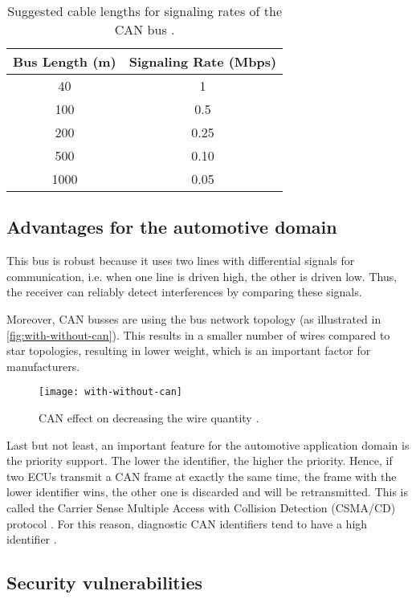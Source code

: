 \begin{table}[htb]
    \centering
    \begin{tabular}{cc}
    \hline
    \textbf{Bus Length (m)} & \textbf{Signaling Rate (Mbps)}\\
    \hline
    40 & 1 \\
    100 & 0.5 \\
    200 & 0.25 \\
    500 & 0.10 \\
    1000 & 0.05 \\
    \hline
\end{tabular}
\caption{Suggested cable lengths for signaling rates of the CAN bus \cite{slla270}.}
\label{tab:can-speed}
\end{table}

\subsection{Advantages for the automotive domain}

This bus is robust because it uses two lines with differential signals for communication, i.e. when one line is driven high, the other is driven low. Thus, the receiver can reliably detect interferences by comparing these signals.

Moreover, CAN busses are using the bus network topology (as illustrated in \autoref{fig:with-without-can}). This results in a smaller number of wires compared to star topologies, resulting in lower weight, which is an important factor for manufacturers.

\begin{figure}[htb]
    \centering
    \texttt{[image: with-without-can]}
    \caption{CAN effect on decreasing the wire quantity \cite{Sharma2016}.}
    \label{fig:with-without-can}
\end{figure}

Last but not least, an important feature for the automotive application domain is the priority support. The lower the identifier, the higher the priority. Hence, if two ECUs transmit a CAN frame at exactly the same time, the frame with the lower identifier wins, the other one is discarded and will be retransmitted. This is called the Carrier Sense Multiple Access with Collision Detection (CSMA/CD) protocol \cite{Sharma2016}. For this reason, diagnostic CAN identifiers tend to have a high identifier \cite{Herrewegen2018}.

\subsection{Security vulnerabilities}

